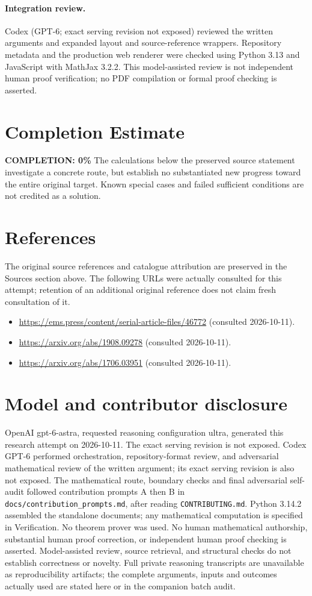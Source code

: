 \documentclass[11pt]{article}
\begin{document}
\paragraph{Integration review.} Codex (GPT-6; exact serving revision not exposed) reviewed the written arguments and expanded layout and source-reference wrappers. Repository metadata and the production web renderer were checked using Python 3.13 and JavaScript with MathJax 3.2.2. This model-assisted review is not independent human proof verification; no PDF compilation or formal proof checking is asserted.

\section{Completion Estimate}
\noindent\textbf{COMPLETION: 0\%}
The calculations below the preserved source statement investigate a concrete route,
but establish no substantiated new progress toward the entire original target.
Known special cases and failed sufficient conditions are not credited as a solution.
\section{References}
The original source references and catalogue attribution are preserved in the
Sources section above. The following URLs were actually consulted for this attempt;
retention of an additional original reference does not claim fresh consultation of it.
\begin{itemize}
\item \url{https://ems.press/content/serial-article-files/46772} (consulted 2026-10-11). 
\item \url{https://arxiv.org/abs/1908.09278} (consulted 2026-10-11). 
\item \url{https://arxiv.org/abs/1706.03951} (consulted 2026-10-11). 
\end{itemize}
\section{Model and contributor disclosure}
OpenAI gpt-6-astra, requested reasoning configuration ultra, generated this research
attempt on 2026-10-11. The exact serving revision is not exposed. Codex GPT-6
performed orchestration, repository-format review, and adversarial mathematical review of the written argument; its exact serving revision
is also not exposed. The mathematical route, boundary checks and final adversarial
self-audit followed contribution prompts A then B in
\texttt{docs/contribution\_prompts.md}, after reading \texttt{CONTRIBUTING.md}.
Python 3.14.2 assembled the standalone documents; any mathematical computation is
specified in Verification. No theorem prover was used. No human mathematical
authorship, substantial human proof correction, or independent human proof checking
is asserted. Model-assisted review, source retrieval, and structural checks do not
establish correctness or novelty. Full private reasoning transcripts are unavailable
as reproducibility artifacts; the complete arguments, inputs and outcomes actually
used are stated here or in the companion batch audit.
\end{document}
